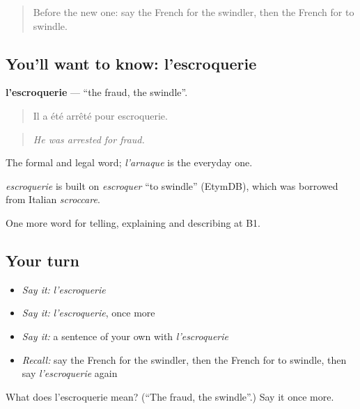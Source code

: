 \label{lesson:FR-C288-escroquerie}



\begin{quote}
Before the new one: say the French for the swindler, then the French for to swindle.
\end{quote}

\subsection*{You'll want to know: l'escroquerie}
\textbf{l'escroquerie} — \textquotedblleft{}the fraud, the swindle\textquotedblright{}.

\begin{quote}
Il a été arrêté pour escroquerie.
\end{quote}

\begin{quote}
\emph{He was arrested for fraud.}
\end{quote}

The formal and legal word; \emph{l'arnaque} is the everyday one.

\begin{cousinweb}
\emph{escroquerie} is built on \emph{escroquer} \textquotedblleft{}to swindle\textquotedblright{} (EtymDB), which was borrowed from Italian \emph{scroccare}.
\end{cousinweb}

\begin{grammarlens}[title={What you've built}]
One more word for telling, explaining and describing at B1.
\end{grammarlens}

\subsection*{Your turn}
\begin{itemize}
\raggedright
  \item \emph{Say it:} \emph{l'escroquerie}
  \item \emph{Say it:} \emph{l'escroquerie}, once more
  \item \emph{Say it:} a sentence of your own with \emph{l'escroquerie}
  \item \emph{Recall:} say the French for the swindler, then the French for to swindle, then say \emph{l'escroquerie} again
\end{itemize}

\begin{tcolorbox}[breakable,colback=teal!4,colframe=teal!35!black,title={Before you move on}]
What does l'escroquerie mean? (\textquotedblleft{}The fraud, the swindle\textquotedblright{}.) Say it once more.
\end{tcolorbox}
